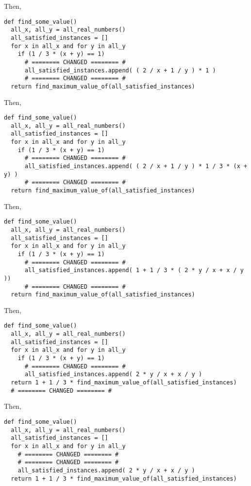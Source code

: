 Then,

\begin{verbatim}
def find_some_value()
  all_x, all_y = all_real_numbers()
  all_satisfied_instances = []
  for x in all_x and for y in all_y
    if (1 / 3 * (x + y) == 1)
      # ======== CHANGED ======== #
      all_satisfied_instances.append( ( 2 / x + 1 / y ) * 1 )
      # ======== CHANGED ======== #
  return find_maximum_value_of(all_satisfied_instances)
\end{verbatim}

Then,

\begin{verbatim}
def find_some_value()
  all_x, all_y = all_real_numbers()
  all_satisfied_instances = []
  for x in all_x and for y in all_y
    if (1 / 3 * (x + y) == 1)
      # ======== CHANGED ======== #
      all_satisfied_instances.append( ( 2 / x + 1 / y ) * 1 / 3 * (x + y) )
      # ======== CHANGED ======== #
  return find_maximum_value_of(all_satisfied_instances)
\end{verbatim}

Then,

\begin{verbatim}
def find_some_value()
  all_x, all_y = all_real_numbers()
  all_satisfied_instances = []
  for x in all_x and for y in all_y
    if (1 / 3 * (x + y) == 1)
      # ======== CHANGED ======== #
      all_satisfied_instances.append( 1 + 1 / 3 * ( 2 * y / x + x / y ))
      # ======== CHANGED ======== #
  return find_maximum_value_of(all_satisfied_instances)
\end{verbatim}

Then,

\begin{verbatim}
def find_some_value()
  all_x, all_y = all_real_numbers()
  all_satisfied_instances = []
  for x in all_x and for y in all_y
    if (1 / 3 * (x + y) == 1)
      # ======== CHANGED ======== #
      all_satisfied_instances.append( 2 * y / x + x / y )
  return 1 + 1 / 3 * find_maximum_value_of(all_satisfied_instances)
  # ======== CHANGED ======== #
\end{verbatim}

Then,

\begin{verbatim}
def find_some_value()
  all_x, all_y = all_real_numbers()
  all_satisfied_instances = []
  for x in all_x and for y in all_y
    # ======== CHANGED ======== #
    # ======== CHANGED ======== #
    all_satisfied_instances.append( 2 * y / x + x / y )
  return 1 + 1 / 3 * find_maximum_value_of(all_satisfied_instances)
\end{verbatim}

